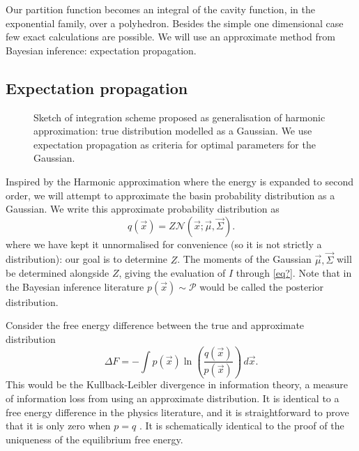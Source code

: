 \documentclass[11pt,twoside]{report}
\begin{document}
Our partition function becomes an integral of the cavity function, in the exponential family, over a polyhedron.
Besides the simple one dimensional case few exact calculations are possible.
We will use an approximate method from Bayesian inference: expectation propagation.

\subsection{Expectation propagation}

\begin{figure}
  \missingfigure[figwidth=\linewidth]{}
  \caption{Sketch of integration scheme proposed as generalisation of harmonic approximation: true distribution modelled as a Gaussian.
    We use expectation propagation as criteria for optimal parameters for the Gaussian.}
\end{figure}

Inspired by the Harmonic approximation where the energy is expanded to second order, we will attempt to approximate the basin probability distribution as a Gaussian.
We write this approximate probability distribution as
\begin{equation}
  q(\vec{x}) = Z \mathcal{N}(\vec{x}; \vec{\mu}, \vec{\Sigma}).
\end{equation}
where we have kept it unnormalised for convenience (so it is not strictly a distribution): our goal is to determine $Z$.
The moments of the Gaussian $\vec{\mu}, \vec{\Sigma}$ will be determined alongside $Z$, giving the evaluation of $I$ through \eqref{eq?}.
Note that in the Bayesian inference literature $p(\vec{x}) \sim \mathcal{P}$ would be called the posterior distribution.

Consider the free energy difference between the true and approximate distribution
\begin{equation}
  \Delta F
  =
  - \int p(\vec{x})
  \ln{\left( \frac{q(\vec{x})}{p(\vec{x})} \right)} \, d\vec{x}.
\end{equation}
This would be the Kullback-Leibler divergence in information theory, a measure of information loss from using an approximate distribution.
It is identical to a free energy difference in the physics literature, and it is straightforward to prove that it is only zero when $p = q$ \cite{Mermin,Evans,BayesianInferencecitation?}.
It is schematically identical to the proof of the uniqueness of the equilibrium free energy.
\end{document}
